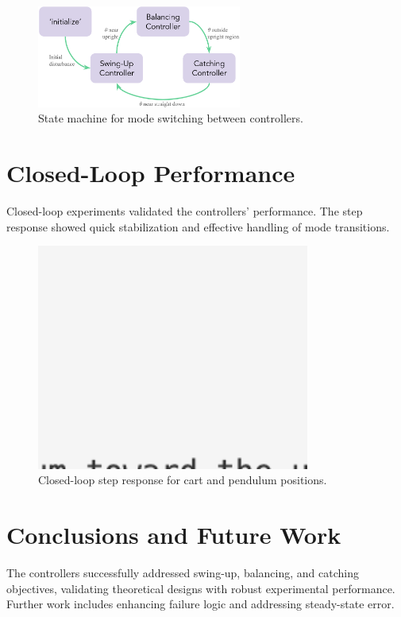 \documentclass[12pt]{article}
\begin{document}
\begin{figure}[H]
    \centering
    \includegraphics[width=0.6\textwidth]{figures/state_machine.png}
    \caption{State machine for mode switching between controllers.}
    \label{fig:state_machine}
\end{figure}

\section{Closed-Loop Performance}

Closed-loop experiments validated the controllers' performance. The step response showed quick stabilization and effective handling of mode transitions.

\begin{figure}[H]
    \centering
    \includegraphics[width=0.8\textwidth]{figures/ph.png}
    \caption{Closed-loop step response for cart and pendulum positions.}
    \label{fig:step_response}
\end{figure}

\section{Conclusions and Future Work}
The controllers successfully addressed swing-up, balancing, and catching objectives, validating theoretical designs with robust experimental performance. Further work includes enhancing failure logic and addressing steady-state error.



\end{document}
